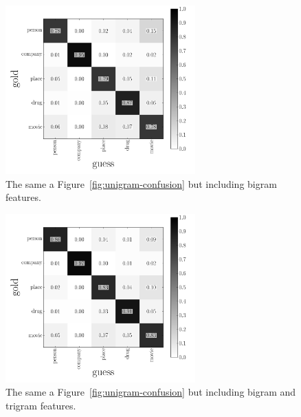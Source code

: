 \documentclass[11pt]{article}
\newcommand{\fig}[1]{Figure~\ref{fig:#1}}
\newcommand{\figlabel}[1]{\label{fig:#1}}
\begin{document}
\begin{figure}[htbp]
\begin{center}
    \includegraphics[width=0.65\textwidth]{bigrams_confusion.pdf}
\end{center}
\caption{%
The same a \fig{unigram-confusion} but including bigram features.
\figlabel{bigram-confusion}}
\end{figure}

\begin{figure}[htbp]
\begin{center}
    \includegraphics[width=0.65\textwidth]{trigram_confusion.pdf}
\end{center}
\caption{%
The same a \fig{unigram-confusion} but including bigram and trigram
features.
\figlabel{trigram-confusion}}
\end{figure}
\end{document}
